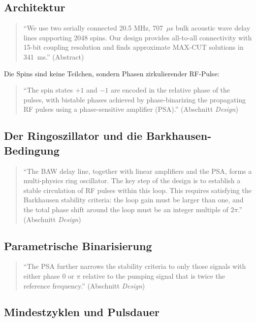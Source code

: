 \subsection{Architektur}

\begin{quote}\QM
\enquote{We use two serially connected 20.5 MHz, 707~$\mu$s bulk acoustic
wave delay lines supporting 2048 spins. Our design provides all-to-all
connectivity with 15-bit coupling resolution and finds approximate MAX-CUT
solutions in 341~ms.} (Abstract)
\end{quote}
Die Spins sind keine Teilchen, sondern Phasen zirkulierender RF-Pulse:
\begin{quote}\QM
\enquote{The spin states $+1$ and $-1$ are encoded in the relative phase of
the pulses, with bistable phases achieved by phase-binarizing the
propagating RF pulses using a phase-sensitive amplifier (PSA).}
(Abschnitt \emph{Design})
\end{quote}

\subsection{Der Ringoszillator und die Barkhausen-Bedingung}

\begin{quote}\QM
\enquote{The BAW delay line, together with linear amplifiers and the PSA,
forms a multi-physics ring oscillator. The key step of the design is to
establish a stable circulation of RF pulses within this loop. This requires
satisfying the Barkhausen stability criteria: the loop gain must be larger
than one, and the total phase shift around the loop must be an integer
multiple of $2\pi$.} (Abschnitt \emph{Design})
\end{quote}

\subsection{Parametrische Binarisierung}

\begin{quote}\QM
\enquote{The PSA further narrows the stability criteria to only those
signals with either phase 0 or $\pi$ relative to the pumping signal that is
twice the reference frequency.} (Abschnitt \emph{Design})
\end{quote}

\subsection{Mindestzyklen und Pulsdauer}

